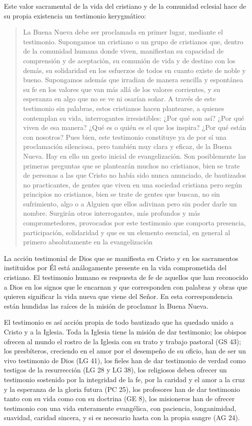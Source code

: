 Este valor sacramental de la vida del cristiano y de la comunidad eclesial hace de su propia existencia un testimonio kerygmático: \blockquote[][\,(EN 21)]{La Buena Nueva debe ser proclamada en primer lugar, mediante el testimonio. Supongamos un cristiano o un grupo de cristianos que, dentro de la comunidad humana donde viven, manifiestan su capacidad de comprensión y de aceptación, su comunión de vida y de destino con los demás, su solidaridad en los esfuerzos de todos en cuanto existe de noble y bueno. Supongamos además que irradian de manera sencilla y espontánea su fe en los valores que van más allá de los valores corrientes, y su esperanza en algo que no se ve ni osarían soñar. A través de este testimonio sin palabras, estos cristianos hacen plantearse, a quienes contemplan su vida, interrogantes irresistibles: ¿Por qué son así? ¿Por qué viven de esa manera? ¿Qué es o quién es el que los inspira? ¿Por qué están con nosotros? Pues bien, este testimonio constituye ya de por sí una proclamación silenciosa, pero también muy clara y eficaz, de la Buena Nueva. Hay en ello un gesto inicial de evangelización. Son posiblemente las primeras preguntas que se plantearán muchos no cristianos, bien se trate de personas a las que Cristo no había sido nunca anunciado, de bautizados no practicantes, de gentes que viven en una sociedad cristiana pero según principios no cristianos, bien se trate de gentes que buscan, no sin sufrimiento, algo o a Alguien que ellos adivinan pero sin poder darle un nombre. Surgirán otros interrogantes, más profundos y más comprometedores, provocados por este testimonio que comporta presencia, participación, solidaridad y que es un elemento esencial, en general al primero absolutamente en la evangelización}. La acción testimonial de Dios que se manifiesta en Cristo y en los sacramentos instituidos por Él está análogamente presente en la vida comprometida del cristiano. El testimonio humano es respuesta de fe de aquellos que han reconocido a Dios en los signos que le encarnan y que corresponden con palabras y obras que quieren significar la vida nueva que viene del Señor. En esta correspondencia están hundidas las raíces de la misión de proclamar la Buena Nueva.

El testimonio es así acción propia de todo bautizado que ha quedado unido a Cristo y a la Iglesia\autocite[Cf.~][188]{prades2015testimonio}. Toda la Iglesia tiene la misión de dar testimonio; los obispos ofrecen al mundo el rostro de la Iglesia con su trato y trabajo pastoral (GS 43); los presbíteros, creciendo en el amor por el desempeño de su oficio, han de ser un vivo testimonio de Dios (LG 41), los fieles han de dar testimonio de verdad como testigos de la resurrección (LG 28 y LG 38), los religiosos deben ofrecer un testimonio sostenido por la integridad de la fe, por la caridad y el amor a la cruz y la esperanza de la gloria futura (PC 25), los profesores han de dar testimonio tanto con su vida como con su doctrina (GE 8), los misioneros han de ofrecer testimonio con una vida enteramente evangélica, con paciencia, longanimidad, suavidad, caridad sincera, y si es necesario hasta con la propia sangre (AG 24).

